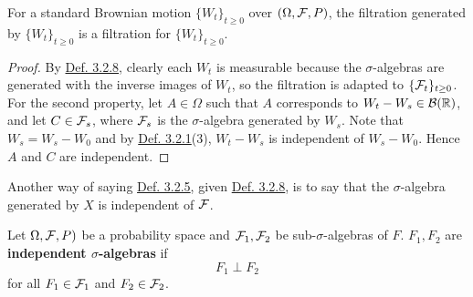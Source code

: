 \documentclass[11pt,fleqn]{book} %
\begin{document}
\begin{definition} \label{def:329}
For a standard Brownian motion \(\{W_t\}_{t \geq 0}\) over \((\Omega, \mathcal{F}, P)\), the filtration generated by \(\{W_t\}_{t\geq0}\) is a filtration for \(\{W_t\}_{t\geq0}\).
\end{definition}
\begin{proof}
By \hyperref[def:328]{Def. 3.2.8}, clearly each \(W_t\) is measurable because the \(\sigma\)-algebras are generated with the inverse images of \(W_t\), so the filtration is adapted to \(\{\mathcal{F}_t\}_{t\geq0}\). \\
\indent For the second property, let \(A \in \Omega\) such that \(A\) corresponds to \(W_t - W_s \in \mathcal{B}(\mathbb{R})\), and let \(C \in \mathcal{F}_s\), where \(\mathcal{F}_s\) is the \(\sigma\)-algebra generated by \(W_s\). Note that \(W_s = W_s - W_0\) and by \hyperref[def:321]{Def. 3.2.1}(3), \(W_t - W_s\) is independent of \(W_s - W_0\). Hence \(A\) and \(C\) are independent.
\end{proof}

\begin{remark} \label{rmk:3210}
Another way of saying \hyperref[def:325]{Def. 3.2.5}, given \hyperref[def:328]{Def. 3.2.8}, is to say that the \(\sigma\)-algebra generated by \(X\) is independent of \(\mathcal{F}\).
\end{remark}

\begin{definition} \label{def:3211}
Let \(\Omega, \mathcal{F}, P)\) be a probability space and \(\mathcal{F}_1, \mathcal{F}_2\) be sub-\(\sigma\)-algebras of \(F\). \(F_1, F_2\) are \textbf{independent \(\sigma\)-algebras} if
\[
F_1 \perp F_2
\]
for all \(F_1 \in \mathcal{F}_1\) and \(F_2 \in \mathcal{F}_2\).
\end{definition}
\end{document}
